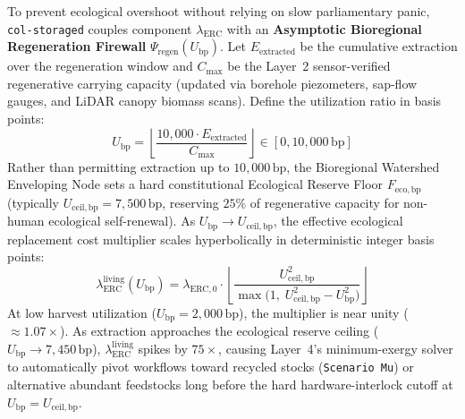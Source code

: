 To prevent ecological overshoot without relying on slow parliamentary panic, \texttt{col-storaged} couples component $\lambda_{\mathrm{ERC}}$ with an \textbf{Asymptotic Bioregional Regeneration Firewall} $\Psi_{\mathrm{regen}}(U_{\mathrm{bp}})$. Let $E_{\mathrm{extracted}}$ be the cumulative extraction over the regeneration window and $C_{\max}$ be the Layer~2 sensor-verified regenerative carrying capacity (updated via borehole piezometers, sap-flow gauges, and LiDAR canopy biomass scans). Define the utilization ratio in basis points:
\begin{equation}
U_{\mathrm{bp}} = \left\lfloor \frac{10{,}000 \cdot E_{\mathrm{extracted}}}{C_{\max}} \right\rfloor \in [0, 10{,}000\,\mathrm{bp}]
\label{eq:ch2-utilization-bp}
\end{equation}
Rather than permitting extraction up to $10{,}000\,\mathrm{bp}$, the Bioregional Watershed Enveloping Node sets a hard constitutional Ecological Reserve Floor $F_{\mathrm{eco},\mathrm{bp}}$ (typically $U_{\mathrm{ceil},\mathrm{bp}} = 7{,}500\,\mathrm{bp}$, reserving $25\%$ of regenerative capacity for non-human ecological self-renewal). As $U_{\mathrm{bp}} \to U_{\mathrm{ceil},\mathrm{bp}}$, the effective ecological replacement cost multiplier scales hyperbolically in deterministic integer basis points:
\begin{equation}
\lambda_{\mathrm{ERC}}^{\mathrm{living}}(U_{\mathrm{bp}}) = \lambda_{\mathrm{ERC},0} \cdot \left\lfloor \frac{U_{\mathrm{ceil},\mathrm{bp}}^2}{\max\bigl(1,\; U_{\mathrm{ceil},\mathrm{bp}}^2 - U_{\mathrm{bp}}^2\bigr)} \right\rfloor
\label{eq:ch2-hyperbolic-firewall}
\end{equation}
At low harvest utilization ($U_{\mathrm{bp}} = 2{,}000\,\mathrm{bp}$), the multiplier is near unity ($\approx 1.07\times$). As extraction approaches the ecological reserve ceiling ($U_{\mathrm{bp}} \to 7{,}450\,\mathrm{bp}$), $\lambda_{\mathrm{ERC}}^{\mathrm{living}}$ spikes by $75\times$, causing Layer~4's minimum-exergy solver to automatically pivot workflows toward recycled stocks (\texttt{Scenario Mu}) or alternative abundant feedstocks long before the hard hardware-interlock cutoff at $U_{\mathrm{bp}} = U_{\mathrm{ceil},\mathrm{bp}}$.


